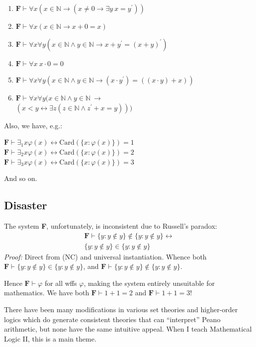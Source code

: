 \documentclass[12pt]{report}
\theoremstyle{nonumberplain}
\newcommand{\N}{\mathbb{N}}
\begin{document}
\medskip\begin{enumerate}[label={},start=5]
\item $\textbf{F} ⊢ ∀x(x ∈ \N → (x ≠ 0 → ∃y\ x = y^{\prime}))$
\item $\textbf{F} ⊢ ∀x(x ∈\N →  x + 0 = x)$
\item $\textbf{F} ⊢ ∀x∀y(x ∈\N ∧  y ∈\N →  x + y^\prime = (x + y)^\prime)$
\item $\textbf{F} ⊢ ∀x\ x \cdot 0 = 0$
\item $\textbf{F} ⊢ ∀x∀y(x ∈\N ∧  y ∈\N →  (x \cdot  y^\prime) = ((x \cdot y) + x))$
\item $\textbf{F} ⊢ ∀x∀y(x ∈\N ∧  y ∈\N\ →$\\\phantom{x}\hfill $(x < y ↔ ∃z(z ∈ \N ∧ z^{\prime}+x = y)))$
\end{enumerate}

\medskip

\noindent Also, we have, e.g.:

\smallskip

\noindent$\textbf{F} ⊢ ∃_{1}{x}φ(x) ↔  \mathrm{Card}(\{x : φ(x)\}) = 1$ \\
$\textbf{F} ⊢ ∃_{2}{x}φ(x) ↔  \mathrm{Card}(\{x : φ(x)\}) = 2$\\
$\textbf{F} ⊢ ∃_{3}{x}φ(x) ↔  \mathrm{Card}(\{x : φ(x)\}) = 3$

\smallskip

\noindent And so on.

\subsection*{Disaster}

The system \textbf{F}, unfortunately, is inconsistent due to Russell's paradox:
\begin{multline*}\textbf{F} ⊢ \{y : y∉ y\} ∉ \{y : y∉ y\} ↔ \\ \{y : y∉ y\} ∈\{y : y∉ y\}
\end{multline*}
\noindent\textit{Proof:} Direct from (NC) and universal instantiation.
Whence both	$\textbf{F} ⊢ \{y : y∉ y\} ∈\{y : y∉ y\}$, and
 	 	$\textbf{F} ⊢ \{y : y∉ y\} ∉ \{y : y∉ y\}$.

Hence $\textbf{F} ⊢ φ$ for all wffs $φ$, making the system entirely unsuitable for mathematics.
We have both $\textbf{F} ⊢ 1 + 1 = 2$ and $\textbf{F} ⊢ 1 + 1 = 3$!

There have been many modifications in various set theories and higher-order logics which do generate consistent theories that can ``interpret'' Peano arithmetic, but none have the same intuitive appeal. When I teach Mathematical Logic II, this is a main theme.
\end{document}
